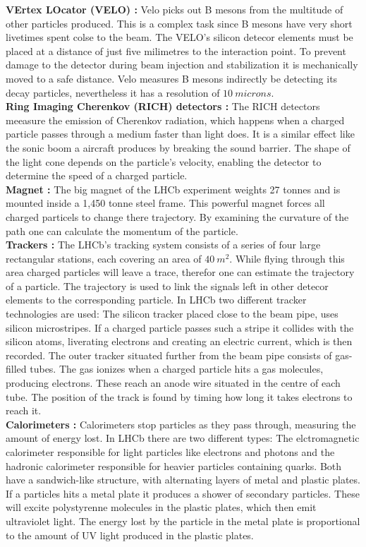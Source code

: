 \documentclass[english]{uzhpub}
\begin{document}
\textbf{VErtex LOcator (VELO) \cite{bib:velo} :} Velo picks out B mesons from the multitude of other particles produced. This is a complex task since B mesons have very short livetimes spent colse to the beam. The VELO's silicon detecor elements must be placed at a distance of just five milimetres to the interaction point. To prevent damage to the detector during beam injection and stabilization it is mechanically moved to a safe distance. Velo measures B mesons indirectly be detecting its decay particles, nevertheless it has a resolution of $\SI{10}{microns}$.\\
\textbf{Ring Imaging Cherenkov (RICH) detectors \cite{bib:rich} :} The RICH detectors meeasure the emission of Cherenkov radiation, which happens when a charged particle passes through a medium faster than light does. It is a similar effect like the sonic boom a aircraft produces by breaking the sound barrier. The shape of the light cone depends on the particle's velocity, enabling the detector to determine the speed of a charged particle.  \\
\textbf{Magnet \cite{bib:mag} :} The big magnet of the LHCb experiment weights 27 tonnes and is mounted inside a 1,450 tonne steel frame. This powerful magnet forces all charged particels to change there trajectory. By examining the curvature of the path one can calculate the momentum of the particle.  \\
\textbf{Trackers \cite{bib:trac} :} The LHCb's tracking system consists of a series of four large rectangular stations, each covering an area of $\SI{40}{m^2}$. While flying through this area charged particles will leave a trace, therefor one can estimate the trajectory of a particle. The trajectory is used to link the signals left in other detecor elements to the corresponding particle. In LHCb two different tracker technologies are used: The silicon tracker placed close to the beam pipe, uses silicon microstripes. If a charged particle passes such a stripe it collides with the silicon atoms, liverating electrons and creating an electric current, which is then recorded. The outer tracker situated further from the beam pipe consists of gas-filled tubes. The gas ionizes when a charged particle hits a gas molecules, producing electrons. These reach an anode wire situated in the centre of each tube. The position of the track is found by timing how long it takes electrons to reach it. \\
\textbf{Calorimeters \cite{bib:calo} :} Calorimeters stop particles as they pass through, measuring the amount of energy lost. In LHCb there are two different types: The elctromagnetic calorimeter responsible for light particles like electrons and photons and the hadronic calorimeter responsible for heavier particles containing quarks. Both have a sandwich-like structure, with alternating layers of metal and plastic plates. If a particles hits a metal plate it produces a shower of secondary particles. These will excite polystyrenne molecules in the plastic plates, which then emit ultraviolet light. The energy lost by the particle in the metal plate is proportional to the amount of UV light produced in the plastic plates. \\
\end{document}
